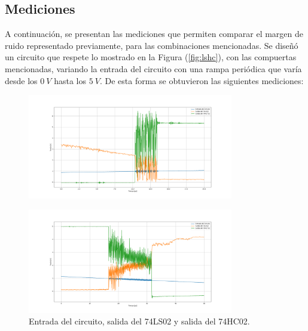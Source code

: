 \subsection{Mediciones}
A continuación, se presentan las mediciones que permiten comparar el margen de ruido representado previamente, para las combinaciones mencionadas. Se diseñó un circuito que respete lo mostrado en la Figura (\ref{fig:lshc}), con las compuertas mencionadas, variando la entrada del circuito con una rampa periódica que varía desde los $0 \ V$ hasta los $5 \ V$. De esta forma se obtuvieron las siguientes mediciones:
\begin{figure}[H]
\centering
	\includegraphics[width=0.8\textwidth]{ImagenesEjercicio2/scope_17_1.png}
\end{figure}
\vspace*{-1cm}
\begin{figure}[H]
\centering
	\includegraphics[width=0.8\textwidth]{ImagenesEjercicio2/scope_18_1.png}	
\caption{Entrada del circuito, salida del 74LS02 y salida del 74HC02.}
\label{fig:medicion1}
\end{figure} 

